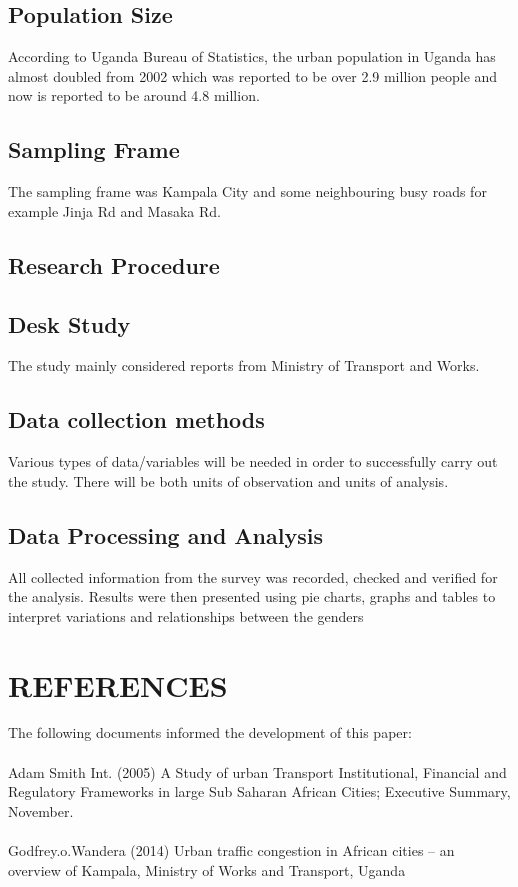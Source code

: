 \documentclass[11pt,A4paper]{article}
\begin{document}
\subsection{Population Size}
According to Uganda Bureau of Statistics, the urban population in Uganda has almost doubled from 2002 which was reported to be over 2.9 million people and now is reported to be around 4.8 million.
\subsection{Sampling Frame}
The sampling frame was  Kampala City and some neighbouring busy roads for example Jinja Rd and Masaka Rd. 
\subsection{Research Procedure}
\subsection{Desk Study}
The study mainly considered reports from Ministry of Transport and Works.
\subsection{Data collection methods}
Various types of data/variables will be needed in order to successfully carry out the study. There
will be both units of observation and units of analysis.
\subsection{Data Processing and Analysis}

All collected information from the survey was recorded, checked and verified for the analysis. Results were then presented using pie charts, graphs and tables to interpret variations and relationships between the genders

\section{REFERENCES}
The following documents informed the development
of this paper:\\ \\
Adam Smith Int. (2005) A Study of urban Transport
Institutional, Financial and Regulatory Frameworks
in large Sub Saharan African Cities; Executive
Summary, November.\\ \\
Godfrey.o.Wandera (2014) Urban traffic congestion
in African cities – an overview of Kampala,
Ministry of Works and Transport, Uganda
\end{document}
